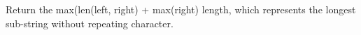 \documentclass[preview]{standalone}
\begin{document}
Return the max(len(left, right) + max(right) length, which represents the longest sub-string without repeating character.\\
\end{document}
